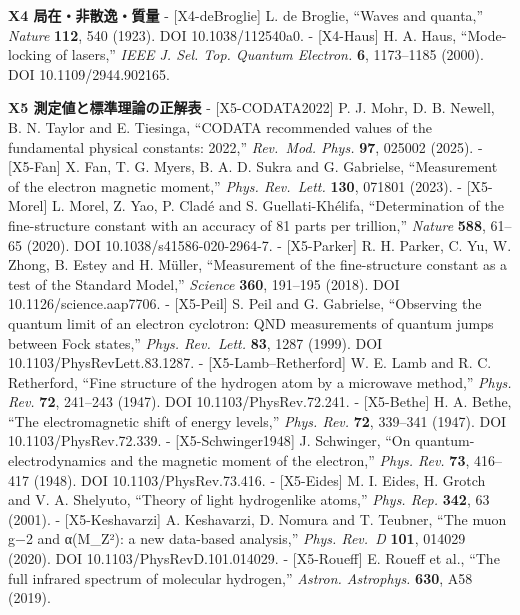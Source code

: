 \documentclass[
  a4paper,
]{ltjsarticle}
\begin{document}
\textbf{X4 局在・非散逸・質量} - {[}X4-deBroglie{]} L. de Broglie,
``Waves and quanta,'' \emph{Nature} \textbf{112}, 540 (1923). DOI
10.1038/112540a0. - {[}X4-Haus{]} H. A. Haus, ``Mode-locking of
lasers,'' \emph{IEEE J. Sel. Top. Quantum Electron.} \textbf{6},
1173--1185 (2000). DOI 10.1109/2944.902165.

\textbf{X5 測定値と標準理論の正解表} - {[}X5-CODATA2022{]} P. J. Mohr,
D. B. Newell, B. N. Taylor and E. Tiesinga, ``CODATA recommended values
of the fundamental physical constants: 2022,'' \emph{Rev.~Mod. Phys.}
\textbf{97}, 025002 (2025). - {[}X5-Fan{]} X. Fan, T. G. Myers, B. A. D.
Sukra and G. Gabrielse, ``Measurement of the electron magnetic moment,''
\emph{Phys. Rev.~Lett.} \textbf{130}, 071801 (2023). - {[}X5-Morel{]} L.
Morel, Z. Yao, P. Cladé and S. Guellati-Khélifa, ``Determination of the
fine-structure constant with an accuracy of 81 parts per trillion,''
\emph{Nature} \textbf{588}, 61--65 (2020). DOI
10.1038/s41586-020-2964-7. - {[}X5-Parker{]} R. H. Parker, C. Yu, W.
Zhong, B. Estey and H. Müller, ``Measurement of the fine-structure
constant as a test of the Standard Model,'' \emph{Science} \textbf{360},
191--195 (2018). DOI 10.1126/science.aap7706. - {[}X5-Peil{]} S. Peil
and G. Gabrielse, ``Observing the quantum limit of an electron
cyclotron: QND measurements of quantum jumps between Fock states,''
\emph{Phys. Rev.~Lett.} \textbf{83}, 1287 (1999). DOI
10.1103/PhysRevLett.83.1287. - {[}X5-Lamb--Retherford{]} W. E. Lamb and
R. C. Retherford, ``Fine structure of the hydrogen atom by a microwave
method,'' \emph{Phys. Rev.} \textbf{72}, 241--243 (1947). DOI
10.1103/PhysRev.72.241. - {[}X5-Bethe{]} H. A. Bethe, ``The
electromagnetic shift of energy levels,'' \emph{Phys. Rev.} \textbf{72},
339--341 (1947). DOI 10.1103/PhysRev.72.339. - {[}X5-Schwinger1948{]} J.
Schwinger, ``On quantum-electrodynamics and the magnetic moment of the
electron,'' \emph{Phys. Rev.} \textbf{73}, 416--417 (1948). DOI
10.1103/PhysRev.73.416. - {[}X5-Eides{]} M. I. Eides, H. Grotch and V.
A. Shelyuto, ``Theory of light hydrogenlike atoms,'' \emph{Phys. Rep.}
\textbf{342}, 63 (2001). - {[}X5-Keshavarzi{]} A. Keshavarzi, D. Nomura
and T. Teubner, ``The muon g−2 and α(M\_Z²): a new data-based
analysis,'' \emph{Phys. Rev.~D} \textbf{101}, 014029 (2020). DOI
10.1103/PhysRevD.101.014029. - {[}X5-Roueff{]} E. Roueff et al., ``The
full infrared spectrum of molecular hydrogen,'' \emph{Astron.
Astrophys.} \textbf{630}, A58 (2019).
\end{document}
